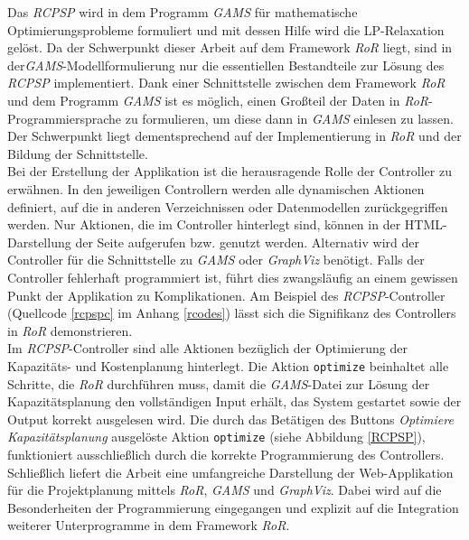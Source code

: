 \documentclass[a4paper,12pt,parskip,bibtotoc,liststotoc]{article}
\begin{document}
Das \textit{RCPSP} wird in dem Programm \textit{GAMS} für mathematische Optimierungsprobleme formuliert und mit dessen Hilfe wird die LP-Relaxation gelöst. Da der Schwerpunkt dieser Arbeit auf dem Framework \textit{RoR} liegt, sind in der\textit{GAMS}-Modellformulierung nur die essentiellen Bestandteile zur Lösung des \textit{RCPSP} implementiert. Dank einer Schnittstelle zwischen dem Framework \textit{RoR} und dem Programm \textit{GAMS} ist es möglich, einen Großteil der Daten in \textit{RoR}-Programmiersprache zu formulieren, um diese dann in \textit{GAMS} einlesen zu lassen. Der Schwerpunkt liegt dementsprechend auf der Implementierung in \textit{RoR} und der Bildung der Schnittstelle.\\

Bei der Erstellung der Applikation ist die herausragende Rolle der Controller zu erwähnen. %
In den jeweiligen Controllern werden alle dynamischen Aktionen definiert, auf die in anderen Verzeichnissen oder Datenmodellen zurückgegriffen werden. Nur Aktionen, die im Controller hinterlegt sind, können in der HTML-Darstellung der Seite aufgerufen bzw. genutzt werden. Alternativ wird der Controller für die Schnittstelle zu \textit{GAMS} oder \textit{GraphViz} benötigt. Falls der Controller fehlerhaft programmiert ist, führt dies zwangsläufig an einem gewissen Punkt der Applikation zu Komplikationen. Am Beispiel des \textit{RCPSP}-Controller (Quellcode \ref{rcpspc} im Anhang \ref{rcodes}) lässt sich die Signifikanz des Controllers in \textit{RoR} demonstrieren.\\

Im \textit{RCPSP}-Controller sind alle Aktionen bezüglich der Optimierung der Kapazitäts- und Kostenplanung hinterlegt. Die Aktion \texttt{optimize} beinhaltet alle Schritte, die \textit{RoR} durchführen muss, damit die \textit{GAMS}-Datei zur Lösung der Kapazitätsplanung den vollständigen Input erhält, das System gestartet sowie der Output korrekt ausgelesen wird. Die durch das Betätigen des Buttons \textit{Optimiere Kapazitätsplanung} ausgelöste Aktion \texttt{optimize} (siehe Abbildung \ref{RCPSP}), funktioniert ausschließlich durch die korrekte Programmierung des Controllers.\\   

Schließlich liefert die Arbeit eine umfangreiche Darstellung der Web-Applikation für die Projektplanung mittels \textit{RoR}, \textit{GAMS} und \textit{GraphViz}. Dabei wird auf die Besonderheiten der Programmierung eingegangen und explizit auf die Integration weiterer Unterprogramme in dem Framework \textit{RoR}.
\end{document}
